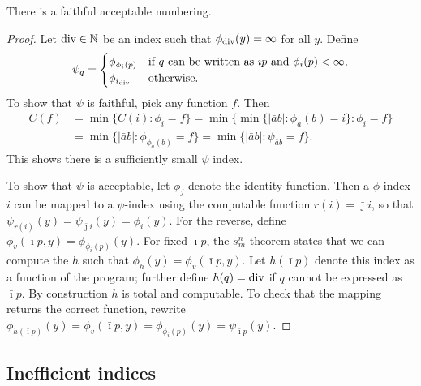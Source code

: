\documentclass{style/llncs}
\newcommand{\N}{\mathbb N}
\newcommand{\tn}[1]{\textnormal{#1}}
\begin{document}
\begin{lemma}
  There is a faithful acceptable numbering.\label{lemma:faithful-numberings}
\end{lemma}
\begin{proof}
Let $\tn{div} \in \N$ be an index such that $\phi_{\tn{div}}(y)=\infty$ for all $y$. Define
  \[\psi_q=\begin{cases}
    \phi_{\phi_i(p)}&\tn{if $q$ can be written as $\bar\imath p$ and $\phi_i(p)<\infty$,}\\
    \phi_{i_\tn{div}}&\tn{otherwise.}\end{cases}
  \]
  To show that $\psi$ is faithful, pick any function $f$. Then
\[\begin{split}
C(f)&=\min\{C(i):\phi_i=f\} =\min\{\min\{|\bar a b|:\phi_a(b)=i\}:\phi_i=f\} \\
& =\min\{|\bar a b|:\phi_{\phi_a(b)}=f\}
 =\min\{|\bar a b|:\psi_{\bar a b}=f\}.
\end{split}\]
This shows there is a sufficiently small $\psi$ index.

To show that $\psi$ is acceptable, let $\phi_j$ denote the identity
function. Then a $\phi$-index $i$ can be mapped to a $\psi$-index
using the computable function $r(i)=\bar\jmath i$, so that
$\psi_{r(i)}(y)=\psi_{\bar\jmath i}(y)=\phi_i(y)$. For the reverse,
define $\phi_v(\bar\imath p, y)=\phi_{\phi_i(p)}(y)$. For fixed
$\bar\imath p$, the 
$s^n_m$-theorem \cite{kleene193notation} states that we can compute the $h$
such that $\phi_h(y)=\phi_v(\bar\imath p,y)$. Let $h(\bar\imath p)$
denote this index as a function of the program; further define
$h(q)=\tn{div}$ if $q$ cannot be expressed as $\bar\imath p$. By
construction $h$ is total and computable. To check that the mapping
returns the correct function, rewrite $\phi_{h(\bar\imath
  p)}(y)=\phi_v(\bar\imath p,y)=\phi_{\phi_i(p)}(y)=\psi_{\bar\imath p}(y)$.
\end{proof}

\subsection{Inefficient indices}
\label{section:appendix-inefficient-indices}

\ineffindices*
\end{document}
